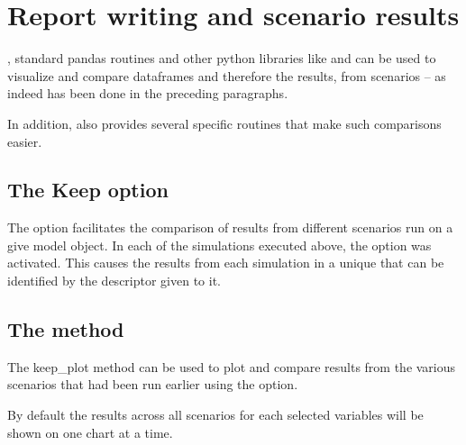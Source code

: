 \documentclass[letterpaper,10pt,english]{jupyterBook}
\begin{document}
\chapter{Report writing and scenario results}
\label{\detokenize{content/05_WBModels/ScenarioAnalysis:report-writing-and-scenario-results}}
\sphinxAtStartPar
{}, standard pandas routines and other python libraries like  and  can be used to visualize and compare dataframes and therefore the results, from scenarios – as indeed has been done in the preceding paragraphs.

\sphinxAtStartPar
In addition,  also provides several specific routines that make such comparisons easier.


\section{The Keep option}
\label{\detokenize{content/05_WBModels/ScenarioAnalysis:the-keep-option}}
\sphinxAtStartPar
The  option facilitates the comparison of results from different scenarios run on a give model object.  In each of the simulations executed above, the  option was activated. This causes the results from each simulation in a unique  that can be identified by the descriptor given to it.


\section{The  method}
\label{\detokenize{content/05_WBModels/ScenarioAnalysis:the-keep-plot-method}}
\sphinxAtStartPar
The keep\_plot method can be used to plot and compare results from the various scenarios that had been run earlier using the  option.

\sphinxAtStartPar
By default the results across all scenarios for each selected variables will be shown on one chart at a time.
\end{document}
